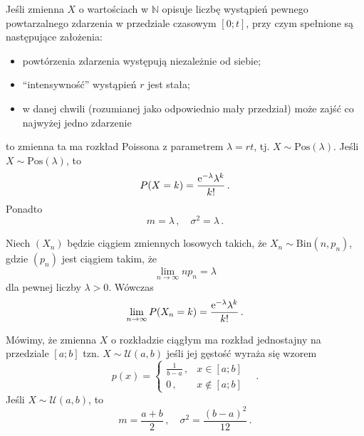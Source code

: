 \documentclass{myclass}
\numberwithin{equation}{section}
\begin{document}
\begin{definition}
Jeśli zmienna \(X\) o wartościach w \(\mathbb{N}\) opisuje liczbę wystąpień pewnego powtarzalnego
zdarzenia w przedziale czasowym \([0;t]\), przy czym spełnione są następujące założenia:
\begin{itemize}

    \item powtórzenia zdarzenia występują niezależnie od siebie;
    
    \item \enquote{intensywność} wystąpień \(r\) jest stała;

    \item w danej chwili (rozumianej jako odpowiednio mały przedział) może zajść co najwyżej jedno
    zdarzenie

\end{itemize}

to zmienna ta ma rozkład Poissona z parametrem \(\lambda = rt\), tj. \(X \sim
\mathrm{Pos}(\lambda)\). Jeśli \(X \sim \mathrm{Pos}(\lambda)\), to
\begin{equation*}
    P(X = k) = \frac{\mathrm{e}^{-\lambda} \lambda^k}{k!}\,.
\end{equation*}
Ponadto
\begin{equation*}
    m = \lambda\,,\quad \sigma^2 = \lambda\,.
\end{equation*}
\end{definition}

\begin{theorem}[Poissona]
Niech \((X_n)\) będzie ciągiem zmiennych losowych takich, że \(X_n \sim \mathrm{Bin}(n, p_n)\), gdzie
\((p_n)\) jest ciągiem takim, że
\begin{equation*}
    \lim_{n \to \infty} n p_n = \lambda
\end{equation*}
dla pewnej liczby \(\lambda > 0\). Wówczas
\begin{equation*}
    \lim_{n \to \infty} P(X_n = k) = \frac{\mathrm{e}^{-\lambda} \lambda^k}{k!}\,.
\end{equation*}
\end{theorem}

\begin{definition}
Mówimy, że zmienna \(X\) o rozkładzie ciągłym ma rozkład jednostajny na przedziale \([a;b]\) tzn.
\(X \sim \mathcal{U}(a,b)\) jeśli jej gęstość wyraża się wzorem
\begin{equation*}
    p(x) = \begin{cases}
        \frac{1}{b - a}\,, &x\in[a;b]\\
        0\,,&x\notin[a;b]
    \end{cases}\quad.
\end{equation*}
Jeśli \(X \sim \mathcal{U}(a,b)\), to
\begin{equation*}
    m = \frac{a+b}{2}\,,\quad \sigma^2 = \frac{(b-a)^2}{12}\,.
\end{equation*}
\end{definition}
\end{document}
